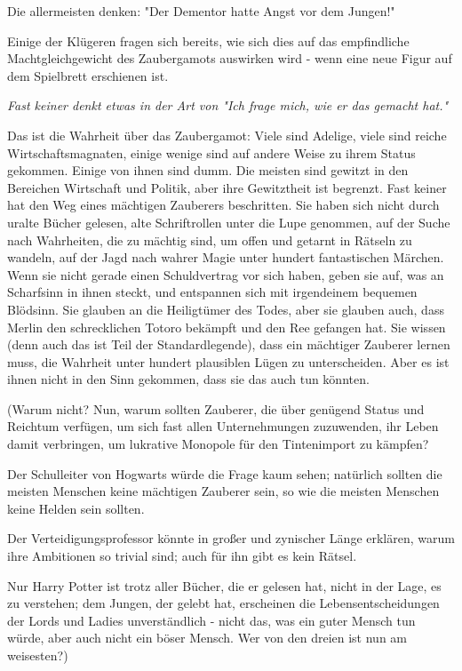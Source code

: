 {Die allermeisten denken: "Der Dementor hatte Angst vor dem Jungen!"

Einige der Klügeren fragen sich bereits, wie sich dies auf das empfindliche Machtgleichgewicht des Zaubergamots auswirken wird - wenn eine neue Figur auf dem Spielbrett erschienen ist.

\emph{Fast keiner denkt etwas in der Art von "Ich frage mich, wie er das gemacht hat."}

Das ist die Wahrheit über das Zaubergamot: Viele sind Adelige, viele sind reiche Wirtschaftsmagnaten, einige wenige sind auf andere Weise zu ihrem Status gekommen. Einige von ihnen sind dumm. Die meisten sind gewitzt in den Bereichen Wirtschaft und Politik, aber ihre Gewitztheit ist begrenzt. Fast keiner hat den Weg eines mächtigen Zauberers beschritten. Sie haben sich nicht durch uralte Bücher gelesen, alte Schriftrollen unter die Lupe genommen, auf der Suche nach Wahrheiten, die zu mächtig sind, um offen und getarnt in Rätseln zu wandeln, auf der Jagd nach wahrer Magie unter hundert fantastischen Märchen. Wenn sie nicht gerade einen Schuldvertrag vor sich haben, geben sie auf, was an Scharfsinn in ihnen steckt, und entspannen sich mit irgendeinem bequemen Blödsinn. Sie glauben an die Heiligtümer des Todes, aber sie glauben auch, dass Merlin den schrecklichen Totoro bekämpft und den Ree gefangen hat. Sie wissen (denn auch das ist Teil der Standardlegende), dass ein mächtiger Zauberer lernen muss, die Wahrheit unter hundert plausiblen Lügen zu unterscheiden. Aber es ist ihnen nicht in den Sinn gekommen, dass sie das auch tun könnten.

(Warum nicht? Nun, warum sollten Zauberer, die über genügend Status und Reichtum verfügen, um sich fast allen Unternehmungen zuzuwenden, ihr Leben damit verbringen, um lukrative Monopole für den Tintenimport zu kämpfen?

Der Schulleiter von Hogwarts würde die Frage kaum sehen; natürlich sollten die meisten Menschen keine mächtigen Zauberer sein, so wie die meisten Menschen keine Helden sein sollten.

Der Verteidigungsprofessor könnte in großer und zynischer Länge erklären, warum ihre Ambitionen so trivial sind; auch für ihn gibt es kein Rätsel.

Nur Harry Potter ist trotz aller Bücher, die er gelesen hat, nicht in der Lage, es zu verstehen; dem Jungen, der gelebt hat, erscheinen die Lebensentscheidungen der Lords und Ladies unverständlich - nicht das, was ein guter Mensch tun würde, aber auch nicht ein böser Mensch. Wer von den dreien ist nun am weisesten?)

}
